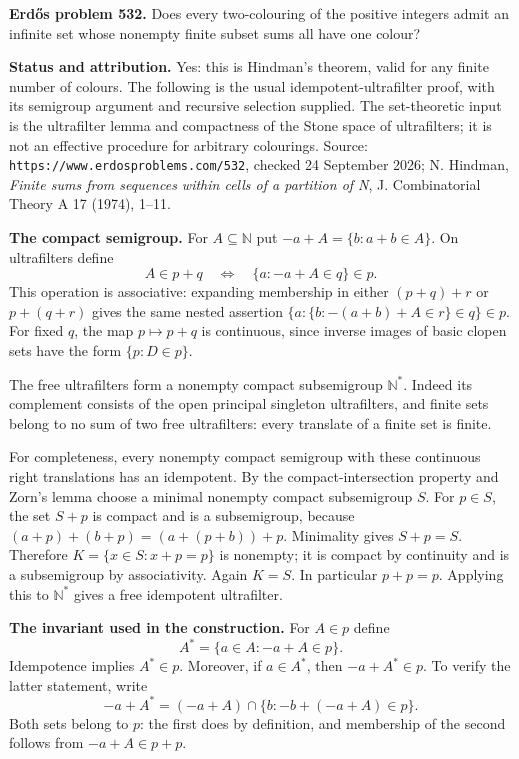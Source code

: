 \textbf{Erd\H{o}s problem 532.}
Does every two-colouring of the positive integers admit an infinite set whose nonempty finite subset sums all have one colour?

\textbf{Status and attribution.}
Yes: this is Hindman's theorem, valid for any finite number of colours. The following is the usual idempotent-ultrafilter proof, with its semigroup argument and recursive selection supplied. The set-theoretic input is the ultrafilter lemma and compactness of the Stone space of ultrafilters; it is not an effective procedure for arbitrary colourings.
Source: \texttt{https://www.erdosproblems.com/532}, checked 24 September 2026; N. Hindman, \emph{Finite sums from sequences within cells of a partition of N}, J. Combinatorial Theory A 17 (1974), 1--11.

\textbf{The compact semigroup.}
For $A\subseteq\mathbb N$ put $-a+A=\{b:a+b\in A\}$. On ultrafilters define
\[
 A\in p+q\quad\Longleftrightarrow\quad
 \{a:-a+A\in q\}\in p.
\]
This operation is associative: expanding membership in either $(p+q)+r$ or $p+(q+r)$ gives the same nested assertion
$\{a:\{b:-(a+b)+A\in r\}\in q\}\in p$.
For fixed $q$, the map $p\mapsto p+q$ is continuous, since inverse images of basic clopen sets have the form $\{p:D\in p\}$.

The free ultrafilters form a nonempty compact subsemigroup $\mathbb N^*$. Indeed its complement consists of the open principal singleton ultrafilters, and finite sets belong to no sum of two free ultrafilters: every translate of a finite set is finite.

For completeness, every nonempty compact semigroup with these continuous right translations has an idempotent. By the compact-intersection property and Zorn's lemma choose a minimal nonempty compact subsemigroup $S$. For $p\in S$, the set $S+p$ is compact and is a subsemigroup, because
$(a+p)+(b+p)=(a+(p+b))+p$. Minimality gives $S+p=S$. Therefore
$K=\{x\in S:x+p=p\}$ is nonempty; it is compact by continuity and is a subsemigroup by associativity. Again $K=S$. In particular $p+p=p$. Applying this to $\mathbb N^*$ gives a free idempotent ultrafilter.

\textbf{The invariant used in the construction.}
For $A\in p$ define
\[
 A^*=\{a\in A:-a+A\in p\}.
\]
Idempotence implies $A^*\in p$. Moreover, if $a\in A^*$, then $-a+A^*\in p$.
To verify the latter statement, write
\[
 -a+A^*=(-a+A)\cap
 \{b:-b+(-a+A)\in p\}.
\]
Both sets belong to $p$: the first does by definition, and membership of the second follows from $-a+A\in p+p$.

